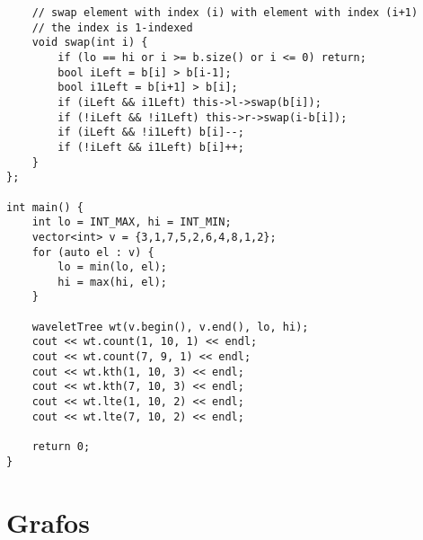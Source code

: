 \documentclass[landscape,twocolumn,10pt,a4paper]{article}
\begin{document}
\begin{verbatim}
    // swap element with index (i) with element with index (i+1)
    // the index is 1-indexed
    void swap(int i) {
        if (lo == hi or i >= b.size() or i <= 0) return;
        bool iLeft = b[i] > b[i-1];
        bool i1Left = b[i+1] > b[i];
        if (iLeft && i1Left) this->l->swap(b[i]);
        if (!iLeft && !i1Left) this->r->swap(i-b[i]);
        if (iLeft && !i1Left) b[i]--;
        if (!iLeft && i1Left) b[i]++;
    }
};

int main() {
    int lo = INT_MAX, hi = INT_MIN;
    vector<int> v = {3,1,7,5,2,6,4,8,1,2};
    for (auto el : v) {
        lo = min(lo, el);
        hi = max(hi, el);
    }

    waveletTree wt(v.begin(), v.end(), lo, hi);
    cout << wt.count(1, 10, 1) << endl;
    cout << wt.count(7, 9, 1) << endl;
    cout << wt.kth(1, 10, 3) << endl;
    cout << wt.kth(7, 10, 3) << endl;
    cout << wt.lte(1, 10, 2) << endl;
    cout << wt.lte(7, 10, 2) << endl;

    return 0;
}\end{verbatim}

\section{Grafos}
\end{document}
